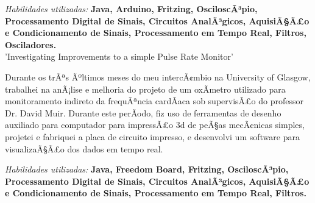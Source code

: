 \documentclass[a4paper]{twentysecondcv} %
\begin{document}
\begin{twenty}
{\hspace{8pt}\textit{Habilidades utilizadas: }\textbf{Java, Arduino, Fritzing, OsciloscÃ³pio, Processamento Digital de Sinais, Circuitos AnalÃ³gicos, AquisiÃ§Ã£o e Condicionamento de Sinais, Processamento em Tempo Real, Filtros, Osciladores.}
}\\


{'Investigating Improvements to a simple Pulse Rate Monitor'}
{}
{\hspace{8pt}Durante os trÃªs Ãºltimos meses do meu intercÃ¢mbio na University of Glasgow, trabalhei na anÃ¡lise e melhoria do projeto de um oxÃ­metro utilizado para monitoramento indireto da frequÃªncia cardÃ­aca sob supervisÃ£o do professor Dr. David Muir. Durante este perÃ­odo, fiz uso de ferramentas de desenho auxiliado para computador para impressÃ£o 3d de peÃ§as mecÃ¢nicas simples, projetei e fabriquei a placa de circuito impresso, e desenvolvi um software para visualizaÃ§Ã£o dos dados em tempo real.

\hspace{8pt}\textit{Habilidades utilizadas:} \textbf{Java, Freedom Board, Fritzing, OsciloscÃ³pio, Processamento Digital de Sinais, Circuitos AnalÃ³gicos, AquisiÃ§Ã£o e Condicionamento de Sinais, Processamento em Tempo Real, Filtros.}}
\end{twenty}
\end{document}
